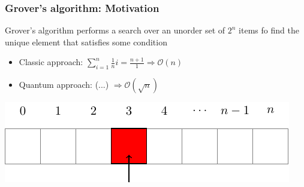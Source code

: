 \begin{frame}
\frametitle{Grover's algorithm: Motivation}
Grover's algorithm performs a search over an unorder set of $2^n$ items fo find the unique element that satisfies some condition

\begin{itemize}
	\item Classic approach: $\sum_{i=1}^{n}\frac{1}{n}i=\frac{n+1}{1}\Rightarrow \mathcal{O}(n)$
	\item Quantum approach: (...) $\Rightarrow \mathcal{O}(\sqrt{n})$
\end{itemize}
\vspace*{1cm}
\begin{center}
	\includegraphics[width=0.7\linewidth, scale=0.75]{figures/outline/search.pdf}
\end{center}

\end{frame}